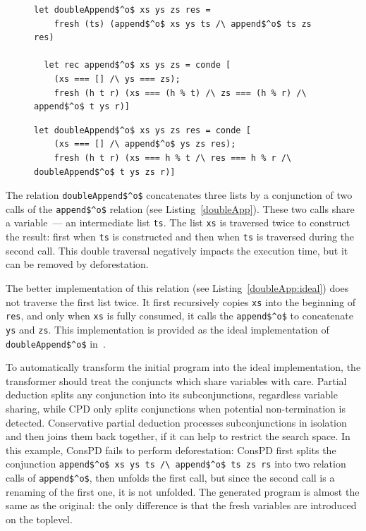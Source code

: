 \begin{figure}[!t]
  \centering
  \begin{minipage}{\textwidth}
    \begin{lstlisting}[label={doubleApp}, caption={Concatenation of three lists}, captionpos=b, frame=tb]
  let doubleAppend$^o$ xs ys zs res =
    fresh (ts) (append$^o$ xs ys ts /\ append$^o$ ts zs res)

  let rec append$^o$ xs ys zs = conde [
    (xs === [] /\ ys === zs);
    fresh (h t r) (xs === (h % t) /\ zs === (h % r) /\ append$^o$ t ys r)]
    \end{lstlisting}
  \end{minipage}

  \begin{minipage}{\textwidth}
\begin{lstlisting}[label={doubleApp:ideal}, caption={Ideal implementation of concatenation of three lists}, captionpos=b, frame=tb]
  let doubleAppend$^o$ xs ys zs res = conde [
    (xs === [] /\ append$^o$ ys zs res);
    fresh (h t r) (xs === h % t /\ res === h % r /\ doubleAppend$^o$ t ys zs r)]
\end{lstlisting}
  \end{minipage}
\end{figure}

The relation \lstinline{doubleAppend$^o$} concatenates three lists by a conjunction of two calls of the \lstinline{append$^o$} relation (see Listing~\ref{doubleApp}).
These two calls share a variable~--- an intermediate list \lstinline{ts}.
The list \lstinline{xs} is traversed twice to construct the result: first when \lstinline{ts} is constructed and then when \lstinline{ts} is traversed during the second call.
This double traversal negatively impacts the execution time, but it can be removed by deforestation.

The better implementation of this relation (see Listing~\ref{doubleApp:ideal}) does not traverse the first list twice.
It first recursively copies \lstinline{xs} into the beginning of \lstinline{res}, and only when \lstinline{xs} is fully consumed, it calls the \lstinline{append$^o$} to concatenate \lstinline{ys} and \lstinline{zs}.
This implementation is provided as the ideal implementation of \lstinline{doubleAppend$^o$} in~\cite{de1999conjunctive}.

To automatically transform the initial program into the ideal implementation, the transformer should treat the conjuncts which share variables with care.
Partial deduction splits any conjunction into its subconjunctions, regardless variable sharing, while CPD only splits conjunctions when potential non-termination is detected.
Conservative partial deduction processes subconjunctions in isolation and then joins them back together, if it can help to restrict the search space.
In this example, ConsPD fails to perform deforestation: ConsPD first splits the conjunction \lstinline{append$^o$ xs ys ts /\ append$^o$ ts zs rs} into two relation calls of \lstinline{append$^o$}, then unfolds the first call, but since the second call is a renaming of the first one, it is not unfolded.
The generated program is almost the same as the original: the only difference is that the fresh variables are introduced on the toplevel.


